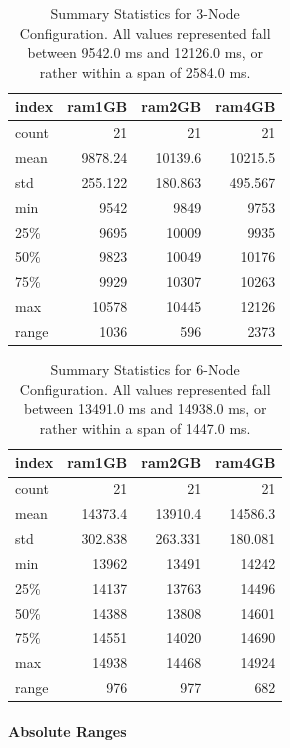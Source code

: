 \begin{table}
\begin{tabular}{lrrr}
\toprule
 index &  ram1GB &  ram2GB &  ram4GB \\
\midrule
 count &      21 &      21 &      21 \\
  mean & 9878.24 & 10139.6 & 10215.5 \\
   std & 255.122 & 180.863 & 495.567 \\
   min &    9542 &    9849 &    9753 \\
   25\% &    9695 &   10009 &    9935 \\
   50\% &    9823 &   10049 &   10176 \\
   75\% &    9929 &   10307 &   10263 \\
   max &   10578 &   10445 &   12126 \\
 range &    1036 &     596 &    2373 \\
\bottomrule
\end{tabular}
\caption{Summary Statistics for 3-Node Configuration. All values represented fall between 9542.0 ms and 12126.0 ms, or rather within a span of 2584.0 ms.}
\label{table:summary_statistics_for_3_config}
\end{table}
\begin{table}
\begin{tabular}{lrrr}
\toprule
 index &  ram1GB &  ram2GB &  ram4GB \\
\midrule
 count &      21 &      21 &      21 \\
  mean & 14373.4 & 13910.4 & 14586.3 \\
   std & 302.838 & 263.331 & 180.081 \\
   min &   13962 &   13491 &   14242 \\
   25\% &   14137 &   13763 &   14496 \\
   50\% &   14388 &   13808 &   14601 \\
   75\% &   14551 &   14020 &   14690 \\
   max &   14938 &   14468 &   14924 \\
 range &     976 &     977 &     682 \\
\bottomrule
\end{tabular}
\caption{Summary Statistics for 6-Node Configuration. All values represented fall between 13491.0 ms and 14938.0 ms, or rather within a span of 1447.0 ms.}
\label{table:summary_statistics_for_6_config}
\end{table}

\paragraph{Absolute Ranges}

